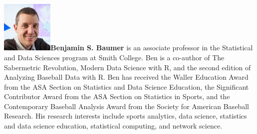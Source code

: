 \documentclass[APA,LATO1COL]{WileyNJD-v2}
\begin{document}
\begin{biography}{\includegraphics[width=70pt,height=70pt]{ben_bio}}{\textbf{Benjamin S. Baumer} is an associate professor in the Statistical and Data Sciences program at Smith College. Ben is a co-author of The Sabermetric Revolution, Modern Data Science with R, and the second edition of Analyzing Baseball Data with R. Ben has received the Waller Education Award from the ASA Section on Statistics and Data Science Education, the Significant Contributor Award from the ASA Section on Statistics in Sports, and the Contemporary Baseball Analysis Award from the Society for American Baseball Research. His research interests include sports analytics, data science, statistics and data science education, statistical computing, and network science.}
\end{biography}
\end{document}
